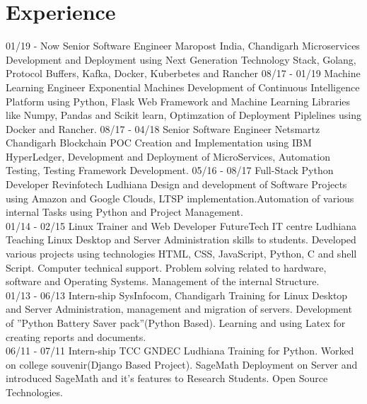 \documentclass[]{friggeri-cv}
\begin{document}
\section{Experience}
\begin{entrylist}
  \entry
    {01/19 - Now }
    {Senior Software Engineer}
    {Maropost India, Chandigarh}
    {Microservices Development and Deployment using Next Generation Technology Stack, Golang, Protocol Buffers, Kafka, Docker, Kuberbetes and Rancher}
  \entry
    {08/17 - 01/19}
    {Machine Learning Engineer}
    {Exponential Machines}
    {Development of Continuous Intelligence Platform using Python, Flask Web Framework and Machine Learning Libraries like Numpy, Pandas and Scikit learn, Optimzation of Deployment Piplelines using Docker and Rancher. }
   \entry
    {08/17 - 04/18}
    {Senior Software Engineer}
    {Netsmartz Chandigarh}
    {Blockchain POC Creation and Implementation using IBM HyperLedger, Development and Deployment of MicroServices, Automation Testing, Testing Framework Development.}
  \entry
    {05/16 - 08/17}
    {Full-Stack Python Developer}
    {Revinfotech Ludhiana}
    {Design and development of Software Projects using Amazon and Google Clouds, LTSP implementation.Automation of various internal Tasks using Python and Project Management.\\}
    \entry
    {01/14 - 02/15}
    {Linux Trainer and Web Developer}
    {FutureTech IT centre Ludhiana}
    {Teaching Linux Desktop and Server Administration skills to students. Developed various projects using technologies HTML, CSS, JavaScript, Python,
C and shell Script. Computer technical support. Problem solving related to hardware, software and Operating Systems. Management of the internal Structure.\\}
    \entry
    {01/13 - 06/13}
    {Intern-ship}
    {SysInfocom, Chandigarh}
    {Training for Linux Desktop and Server Administration, management and migration of servers. Development of ”Python Battery Saver pack”(Python Based). Learning and using Latex for creating reports and documents.\\}
    \entry
    {06/11 - 07/11}
    {Intern-ship}
    {TCC GNDEC Ludhiana}
    {Training for Python. Worked on college souvenir(Django Based Project).
SageMath Deployment on Server and introduced SageMath and it’s features
to Research Students. Open Source Technologies.\\}
\end{entrylist}
\end{document}
